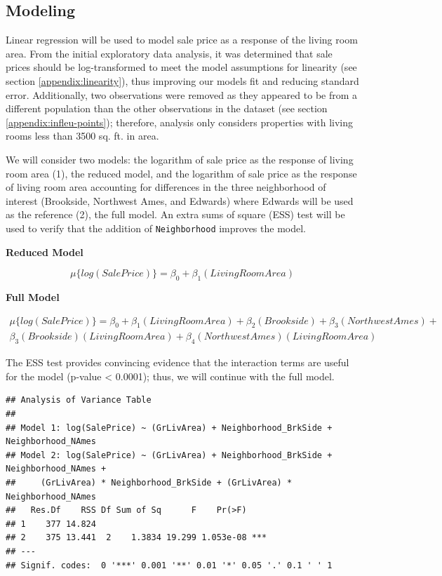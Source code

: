 \documentclass[american,]{article}
\theoremstyle{definition}
\theoremstyle{definition}
\theoremstyle{definition}
\theoremstyle{remark}
\begin{document}
\hypertarget{modeling}{%
\subsection{Modeling}\label{modeling}}

Linear regression will be used to model sale price as a response of the
living room area. From the initial exploratory data analysis, it was
determined that sale prices should be log-transformed to meet the model
assumptions for linearity (see section \ref{appendix:linearity}), thus
improving our models fit and reducing standard error. Additionally, two
observations were removed as they appeared to be from a different
population than the other observations in the dataset (see section
\ref{appendix:infleu-points}); therefore, analysis only considers
properties with living rooms less than 3500 sq. ft. in area.

We will consider two models: the logarithm of sale price as the response
of living room area (1), the reduced model, and the logarithm of sale
price as the response of living room area accounting for differences in
the three neighborhood of interest (Brookside, Northwest Ames, and
Edwards) where Edwards will be used as the reference (2), the full
model. An extra sums of square (ESS) test will be used to verify that
the addition of \texttt{Neighborhood} improves the model.

\textbf{Reduced Model}

\begin{equation}
\mu \lbrace log(SalePrice) \rbrace = \beta_0 + \beta_1(LivingRoomArea) \label{eq:reduced}
\end{equation}

\textbf{Full Model}

\begin{align}
\mu \lbrace log(SalePrice) \rbrace = \beta_0 + \beta_1(LivingRoomArea) +  \beta_2(Brookside) +\beta_3(NorthwestAmes) + \nonumber\\
\beta_3(Brookside)(LivingRoomArea) + \beta_4(NorthwestAmes)(LivingRoomArea) \label{eq:full}
\end{align}

The ESS test provides convincing evidence that the interaction terms are
useful for the model (p-value \textless{} 0.0001); thus, we will
continue with the full model.

\begin{verbatim}
## Analysis of Variance Table
## 
## Model 1: log(SalePrice) ~ (GrLivArea) + Neighborhood_BrkSide + Neighborhood_NAmes
## Model 2: log(SalePrice) ~ (GrLivArea) + Neighborhood_BrkSide + Neighborhood_NAmes + 
##     (GrLivArea) * Neighborhood_BrkSide + (GrLivArea) * Neighborhood_NAmes
##   Res.Df    RSS Df Sum of Sq      F    Pr(>F)    
## 1    377 14.824                                  
## 2    375 13.441  2    1.3834 19.299 1.053e-08 ***
## ---
## Signif. codes:  0 '***' 0.001 '**' 0.01 '*' 0.05 '.' 0.1 ' ' 1
\end{verbatim}
\end{document}
